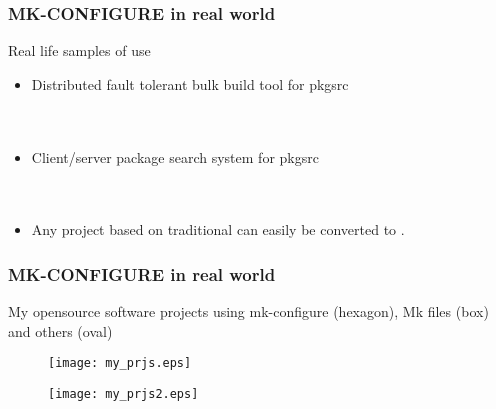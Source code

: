 \documentclass[hyperref={colorlinks=true}]{beamer}
\begin{document}

\begin{frame}[fragile,t]
  \frametitle{MK-CONFIGURE in real world}
  \begin{block}{Real life samples of use}
  \begin{itemize}
  \item Distributed fault tolerant bulk build tool for pkgsrc\\
    \\
    \\
  \item Client/server package search system for pkgsrc\\
    \\
    \\
  \item Any project based on traditional
     can easily be converted
    to .
  \end{itemize}
  \end{block}
\end{frame}



\begin{frame}[fragile,t]
  \frametitle{MK-CONFIGURE in real world}
  \begin{block}{My opensource software projects using
      mk-configure (hexagon), Mk files (box) and others (oval)}
    \begin{figure}
      \texttt{[image: my\_prjs.eps]}
    \end{figure}
    \begin{figure}
      \texttt{[image: my\_prjs2.eps]}
    \end{figure}
  \end{block}
\end{frame}

\end{document}
